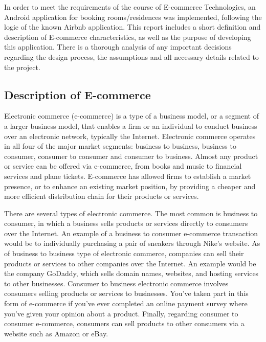 \documentclass[12pt]{article}
\begin{document}
	In order to meet the requirements of the course of E-commerce Technologies, an Android application for booking rooms/residences was implemented, following the logic of the known Airbnb application. This report includes a short definition and description of E-commerce characteristics, as well as the purpose of developing this application. There is a thorough analysis of any important decisions regarding the design process, the assumptions and all necessary details related to the project. 
	
	\subsection{Description of E-commerce}
	
	
	Electronic commerce (e-commerce) is a type of a business model, or a segment of a larger business model, that enables a firm or an individual to conduct business over an electronic network, typically the Internet. Electronic commerce operates in all four of the major market segments: business to business, business to consumer, consumer to consumer and consumer to business. Almost any product or service can be offered via e-commerce, from books and music to financial services and plane tickets. E-commerce has allowed firms to establish a market presence, or to enhance an existing market position, by providing a cheaper and more efficient distribution chain for their products or services.
	
	There are several types of electronic commerce. The most common is business to consumer, in which a business sells products or services directly to consumers over the Internet. An example of a business to consumer e-commerce transaction would be to individually purchasing a pair of sneakers through Nike's website. As of business to business type of electronic commerce, companies can sell their products or services to other companies over the Internet. An example would be the company GoDaddy, which sells domain names, websites, and hosting services to other businesses. Consumer to business electronic commerce involves consumers selling products or services to businesses. You've taken part in this form of e-commerce if you've ever completed an online payment survey where you've given your opinion about a product. Finally, regarding consumer to consumer e-commerce, consumers can sell products to other consumers via a website such as Amazon or eBay.
	
\end{document}
